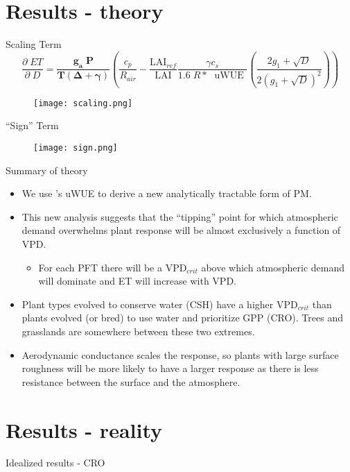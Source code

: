 \documentclass{beamer}
\begin{document}
\section{Results - theory}
\begin{frame}{Scaling Term}
  \[\frac{\partial \;  ET}{\partial \; D} = \mathbf{ \frac{g_a \; P}{T(\Delta + \gamma)} }   \left(\frac{ c_p}{R_{air}} - \frac{\text{LAI$_{ref}$}}{\text{LAI}} \frac{\gamma c_s }{1.6 \; R*\; \text{ uWUE }} \left( \frac{2 g_1 + \sqrt{D}}{2 (g_1 + \sqrt{D})^2}\right) \right)\]
\begin{figure}
  \texttt{[image: scaling.png]}
\end{figure}
\end{frame}

\begin{frame}{``Sign'' Term}
  \begin{figure}
    \texttt{[image: sign.png]}
  \end{figure}
\end{frame}

\begin{frame}{Summary of theory}
  \begin{itemize}
  \item We use \cite{Zhou_2016}'s uWUE to derive a new analytically tractable form of PM.
  \item This new analysis suggests that the ``tipping'' point for which atmospheric demand overwhelms plant response will be almost exclusively a function of VPD.
    \begin{itemize}
    \item For each PFT there will be a VPD$_{crit}$ above which atmospheric demand will dominate and ET will increase with VPD.
    \end{itemize}
  \item Plant types evolved to conserve water (CSH) have a higher VPD$_{crit}$ than plants evolved (or bred) to use water and prioritize GPP (CRO). Trees and grasslands are somewhere between these two extremes.
  \item Aerodynamic conductance scales the response, so plants with large surface roughness will be more likely to have a larger response as there is less resistance between the surface and the atmosphere.
  \end{itemize}
\end{frame}

\section{Results - reality}
{ %
    \begin{frame}[plain]{Idealized results - CRO}
     \end{frame}
}
\end{document}
